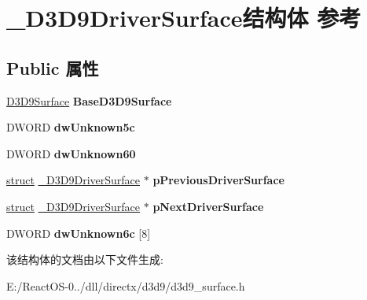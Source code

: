 \hypertarget{struct___d3_d9_driver_surface}{}\section{\+\_\+\+D3\+D9\+Driver\+Surface结构体 参考}
\label{struct___d3_d9_driver_surface}
\subsection*{Public 属性}
\begin{DoxyCompactItemize}
\item 
\mbox{\label{struct___d3_d9_driver_surface_a0cba2ac38dbf4f21a19a8afffefc1502}} 
\hyperlink{struct___d3_d9_surface}{D3\+D9\+Surface} {\bfseries Base\+D3\+D9\+Surface}
\item 
\mbox{\label{struct___d3_d9_driver_surface_a7b7ff31215e70f3a5484f50461a4cbde}} 
D\+W\+O\+RD {\bfseries dw\+Unknown5c}
\item 
\mbox{\label{struct___d3_d9_driver_surface_af35f28ffde74c51e4a021b5734fdc8d5}} 
D\+W\+O\+RD {\bfseries dw\+Unknown60}
\item 
\mbox{\label{struct___d3_d9_driver_surface_a7baeb2c089ffebbad847f3ecfe8ef2ee}} 
\hyperlink{interfacestruct}{struct} \hyperlink{struct___d3_d9_driver_surface}{\+\_\+\+D3\+D9\+Driver\+Surface} $\ast$ {\bfseries p\+Previous\+Driver\+Surface}
\item 
\mbox{\label{struct___d3_d9_driver_surface_acee06657441d124d967dfeec03460020}} 
\hyperlink{interfacestruct}{struct} \hyperlink{struct___d3_d9_driver_surface}{\+\_\+\+D3\+D9\+Driver\+Surface} $\ast$ {\bfseries p\+Next\+Driver\+Surface}
\item 
\mbox{\label{struct___d3_d9_driver_surface_a2d6a74a4805aaf1370d098085dafe679}} 
D\+W\+O\+RD {\bfseries dw\+Unknown6c} \mbox{[}8\mbox{]}
\end{DoxyCompactItemize}


该结构体的文档由以下文件生成\+:\begin{DoxyCompactItemize}
\item 
E\+:/\+React\+O\+S-\/0../dll/directx/d3d9/d3d9\+\_\+surface.\+h\end{DoxyCompactItemize}
